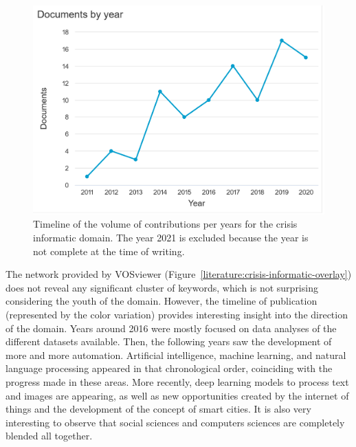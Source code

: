 \begin{figure}[htb]
    \includegraphics[width=\textwidth]{figures/chap-2/crisis-informatic-hist.pdf}
    \caption{Timeline of the volume of contributions per years for the crisis informatic domain. The year 2021 is excluded because the year is not complete at the time of writing.}
    \label{literature:crisis-informatic-hist}
\end{figure}

The network provided by VOSviewer (Figure~\ref{literature:crisis-informatic-overlay}) does not reveal any significant cluster of keywords, which is not surprising considering the youth of the domain.
However, the timeline of publication (represented by the color variation) provides interesting insight into the direction of the domain.
Years around 2016 were mostly focused on data analyses of the different datasets available.
Then, the following years saw the development of more and more automation.
Artificial intelligence, machine learning, and natural language processing appeared in that chronological order, coinciding with the progress made in these areas.
More recently, deep learning models to process text and images are appearing, as well as new opportunities created by the internet of things and the development of the concept of smart cities.
It is also very interesting to observe that social sciences and computers sciences are completely blended all together.


